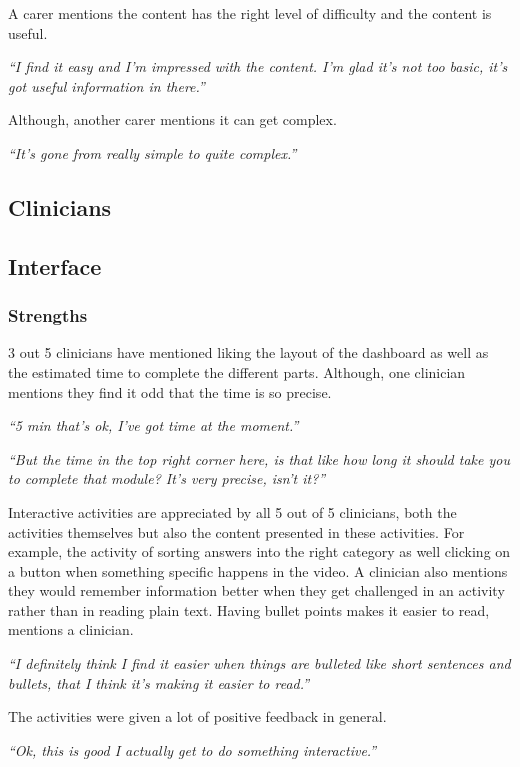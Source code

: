\documentclass{sigchi}
\begin{document}
A carer mentions the content has the right level of difficulty and the content is useful. 

\textit{“I find it easy and I’m impressed with the content. I’m glad it’s not too basic, it’s got useful information in there.”}

Although, another carer mentions it can get complex.

\textit{“It’s gone from really simple to quite complex.”}

\subsection{Clinicians}

\subsection{Interface}

\subsubsection{Strengths}
3 out 5 clinicians have mentioned liking the layout of the dashboard as well as the estimated time to complete the different parts. Although, one clinician mentions they find it odd that the time is so precise.

\textit{“5 min that’s ok, I’ve got time at the moment.”}

\textit{“But the time in the top right corner here, is that like how long it should take you to complete that module? It’s very precise, isn’t it?”}

Interactive activities are appreciated by all 5 out of 5 clinicians, both the activities themselves but also the content presented in these activities. For example, the activity of sorting answers into the right category as well clicking on a button when something specific happens in the video. A clinician also mentions they would remember information better when they get challenged in an activity rather than in reading plain text. Having bullet points makes it easier to read, mentions a clinician.

\textit{“I definitely think I find it easier when things are bulleted like short sentences and bullets, that I think it’s making it easier to read.”}

The activities were given a lot of positive feedback in general.

\textit{“Ok, this is good I actually get to do something interactive.”} 
\end{document}
